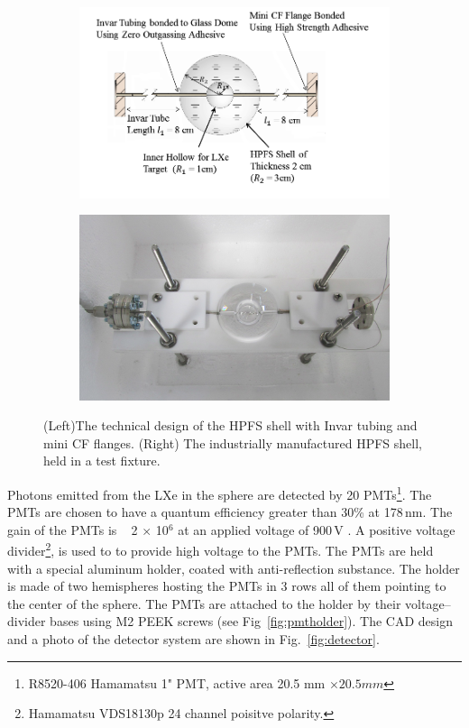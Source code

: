 \begin{figure}[h]
\centering
\begin{subfigure}[c]{0.4\textheight}
\includegraphics[width=\textwidth]{spheredesign1.png}
\end{subfigure}
\begin{subfigure}[c]{0.25\textheight}
\includegraphics[width=\textwidth]{spherephoto.png}
\end{subfigure}
\caption{(Left)The technical design of the HPFS shell with Invar tubing and mini CF flanges. 
(Right) The industrially manufactured HPFS shell, held in a test fixture.} 
\label{fig:sphere}
\end{figure}



Photons emitted from the LXe in the sphere are detected by 20  PMTs\footnote{R8520-406 Hamamatsu 1" PMT, active area 20.5 mm $\times 20.5 mm$}. 
The PMTs are chosen to have a quantum efficiency greater than 30\% at 178\,nm. The gain of the PMTs is ~ 2 $\times$ 10$^6$ at an applied voltage of 900\,V . A positive voltage divider\footnote{Hamamatsu VDS18130p 24 channel poisitve polarity.}, is used to to provide high voltage to the PMTs. 
The PMTs are held with a special aluminum holder, coated with anti-reflection substance. 
The holder is made of two hemispheres hosting the PMTs in 3 rows all of them pointing to the 
center of the sphere. The PMTs are attached to the holder by their voltage--divider bases using M2 PEEK screws (see Fig~\ref{fig:pmtholder}). 
The CAD design and a photo of the detector system are shown 
in Fig.~\ref{fig:detector}.

